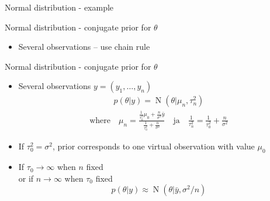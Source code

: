 \documentclass[english,t]{beamer}
\DeclareMathOperator{\N}{N}
\begin{document}
\begin{frame}{Normal distribution - example}

  
\end{frame}

\begin{frame}{Normal distribution - conjugate prior for $\theta$}

  \begin{itemize}
  \item Several observations -- use chain rule
  \end{itemize}

\end{frame}

\begin{frame}
{Normal distribution - conjugate prior for $\theta$}

  \begin{itemize}
  \item Several observations $y=(y_1,\ldots,y_n)$
    \begin{align*}
      p(\theta|y) = \N(\theta|\mu_n,\tau_n^2)
    \end{align*}
    \vskip -6mm
    \begin{align*}
      \text{where} \quad
      \mu_n=\frac{\frac{1}{\tau_0^2}\mu_0+\frac{n}{\sigma^2}\bar{y}}{\frac{1}{\tau_0^2}+\frac{n}{\sigma^2}} \quad
      \text{ja} \quad \frac{1}{\tau_n^2} = \frac{1}{\tau_0^2}+\frac{n}{\sigma^2}
    \end{align*}
  \item If $\tau_0^2=\sigma^2$, prior corresponds to one virtual observation with value $\mu_0$
    \pause
    \item If $\tau_0\rightarrow\infty$ when $n$ fixed\\
      or if $n\rightarrow\infty$ when $\tau_0$ fixed
      \begin{equation*}
        p(\theta|y) \approx \N(\theta|\bar{y},\sigma^2/n)
      \end{equation*}
  \end{itemize}

\end{frame}
\end{document}
